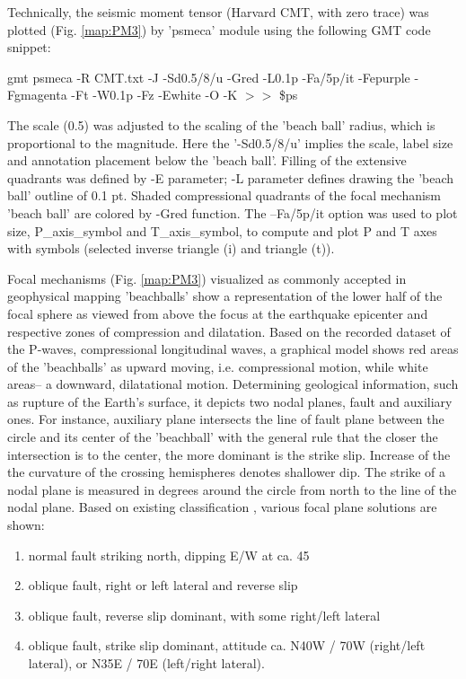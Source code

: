 \documentclass[11pt,a4paper]{report}
\begin{document}
{Technically, the seismic moment tensor (Harvard \ac{CMT}, with zero trace) was plotted (Fig. \ref{map:PM3}) by 'psmeca' module using the following GMT code snippet: 

gmt psmeca -R CMT.txt -J -Sd0.5/8/u -Gred -L0.1p -Fa/5p/it -Fepurple -Fgmagenta -Ft -W0.1p -Fz -Ewhite -O -K $>>$ \$ps

The scale (0.5) was adjusted to the scaling of the 'beach ball' radius, which is proportional to the magnitude. Here the '-Sd0.5/8/u' implies the scale, label size and annotation placement below the 'beach ball'. Filling of the extensive quadrants was defined by -E parameter; -L parameter defines drawing the 'beach ball' outline of 0.1 pt. Shaded compressional quadrants of the focal mechanism 'beach ball' are colored by -Gred function. The --Fa/5p/it option was used to plot size, P\_axis\_symbol and T\_axis\_symbol, to compute and plot P and T axes with symbols (selected inverse triangle (i) and triangle (t)). 

Focal mechanisms (Fig. \ref{map:PM3}) visualized as commonly accepted in geophysical mapping 'beachballs' show a representation of the lower half of the focal sphere as viewed from above the focus at the earthquake epicenter and respective zones of compression and dilatation. Based on the recorded dataset of the P-waves, compressional longitudinal waves, a graphical model shows red areas of the 'beachballs' as upward moving, i.e. compressional motion, while white areas-- a downward, dilatational motion. Determining geological information, such as rupture of the Earth's surface, it depicts two nodal planes, fault and auxiliary ones. For instance, auxiliary plane intersects the line of fault plane between the circle and its center of the 'beachball' with the general rule that the closer the intersection is to the center, the more dominant is the strike slip. Increase of the the curvature of the crossing hemispheres denotes shallower dip. The strike of a nodal plane is measured in degrees around the circle from north to the line of the nodal plane. Based on existing classification \cite{Muller2002}, various focal plane solutions are shown: 

\begin{enumerate}
	\item normal fault striking north, dipping E/W at ca. 45\degree
	\item oblique fault, right or left lateral and reverse slip
	\item oblique fault, reverse slip dominant, with some right/left lateral 
	\item oblique fault, strike slip dominant, attitude ca. N\degree 40W / 70\degree W (right/left lateral), or N35\degree E / 70\degree E (left/right lateral).
\end{enumerate}

}
\end{document}
